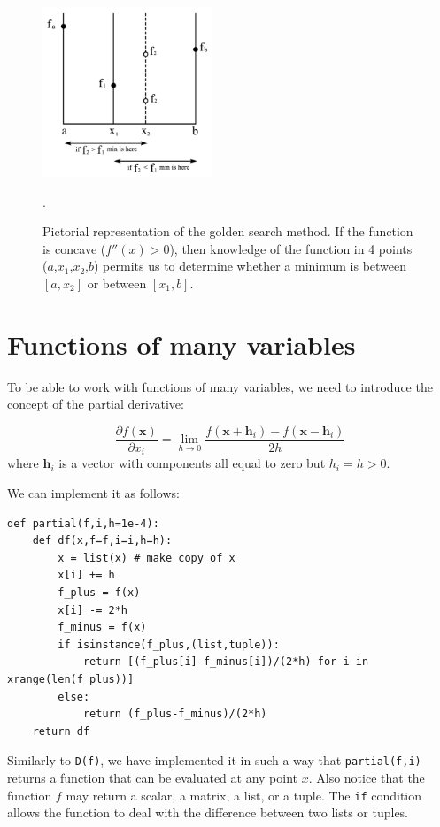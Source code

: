 \documentclass[justified,sixbynine]{tufte-book}
\def\ft{\small\tt}
\theoremstyle{plain}%
\theoremstyle{definition}
\theoremstyle{remark}
\begin{document}
\begin{fullwidth}
\begin{figure}[ht]
\centering\includegraphics[width=2in]{images/golden.png}
\caption{Pictorial representation of the golden search method. If the function is concave ($f''(x)>0$), then knowledge of the function in 4 points ($a$,$x_1$,$x_2$,$b$) permits us to determine whether a minimum is between $[a,x_2]$ or between $[x_1,b]$.\label{golden-pic}}.
\end{figure}

\goodbreak\section{Functions of many variables}


To be able to work with functions of many variables, we need to introduce the concept of the partial derivative:

\begin{equation}
\frac{\partial f(\mathbf{x})}{\partial x_i} = \lim_{h \rightarrow 0} \frac{f(\mathbf{x}+\mathbf{h}_i) - f(\mathbf{x}-\mathbf{h}_i)}{2h}
\end{equation}
where $\mathbf{h}_i$ is a vector with components all equal to zero but $h_i = h > 0$.

We can implement it as follows:

\begin{lstlisting}[caption={in file: {\ft nlib.py}}]
def partial(f,i,h=1e-4):
    def df(x,f=f,i=i,h=h):
        x = list(x) # make copy of x
        x[i] += h
        f_plus = f(x)
        x[i] -= 2*h
        f_minus = f(x)
        if isinstance(f_plus,(list,tuple)):
            return [(f_plus[i]-f_minus[i])/(2*h) for i in xrange(len(f_plus))]
        else:
            return (f_plus-f_minus)/(2*h)
    return df
\end{lstlisting}

Similarly to {\ft D(f)}, we have implemented it in such a way that {\ft partial(f,i)} returns a function that can be evaluated at any point $x$. Also notice that the function $f$ may return a scalar, a matrix, a list, or a tuple. The {\ft if} condition allows the function to deal with the difference between two lists or tuples.


\end{fullwidth}
\end{document}
